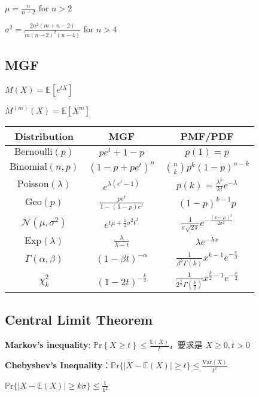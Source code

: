 \documentclass[9pt,landscape]{article}
\begin{document}
\begin{multicols}{3}
$\mu=\frac{n}{n-2}$ for $n>2$

$\sigma^2=\frac{2n^2(m+n-2)}{m(n-2)^2(n-4)}$ for $n>4$

\subsection{MGF}

$M(X)=\mathbb{E}\left[e^{tX}\right]$

$M^{(m)}(X)=\mathbb{E}\left[X^m\right]$

\begin{tabular}{|c|c|c|}
\hline
\textbf{Distribution} & \textbf{MGF} & \textbf{PMF/PDF}\\ \hline
$\mathrm{Bernoulli}(p)$ & $pe^t + 1-p$ & $p(1)=p$ \\ \hline
$\mathrm{Binomial}(n, p)$ & $(1-p + pe^t)^n$&$\binom{n}{k}p^k(1-p)^{n-k}$\\ \hline
$\mathrm{Poisson}(\lambda)$ & $e^{\lambda(e^t - 1)}$ &$p(k)=\frac{\lambda^k}{k!}e^{-\lambda}$\\ \hline
$\mathrm{Geo}(p)$ & $\frac{pe^t}{1-(1-p)e^t}$ & $(1-p)^{k-1}p$ \\ \hline
$\mathcal{N}(\mu, \sigma^2)$ & $e^{t\mu + \frac{1}{2}\sigma^2 t^2}$ &$\frac{1}{\sigma\sqrt{2\pi}}e^{-\frac{(x-\mu)^2}{2\sigma^2}}$  \\ \hline
$\mathrm{Exp}(\lambda)$ & $\frac{\lambda}{\lambda - t}$ & $\lambda e^{-\lambda x}$ \\ \hline
$\Gamma(\alpha, \beta)$ & $(1 - \beta t)^{-\alpha}$ & $\frac{1}{\beta^k\Gamma(k)}x^{k-1}e^{-\frac{x}{\beta}}$ \\ \hline
$\chi^2_k$ & $(1 - 2t)^{-\frac{k}{2}}$ &$\frac{1}{2^{\frac{k}{2}}\Gamma\left(\frac{k}{2}\right)}x^{\frac{k}{2}-1}e^{-\frac{x}{2}}$\\ \hline
\end{tabular}

\subsection{Central Limit Theorem}

\textbf{Markov's inequality}: $\mathbb{P}\mathrm{r}\left\{X\ge t\right\}\le\frac{\mathbb{E}(X)}{t}$，要求是 $X\ge 0, t>0$

\textbf{Chebyshev's Inequality}：$\mathbb{P}\mathrm{r}\{|X-\mathbb{E}(X)|\ge t\}\le\frac{\mathrm{Var}(X)}{t^2}$

$\mathbb{P}\mathrm{r}\{|X-\mathbb{E}(X)|\ge k\sigma\}\le\frac{1}{k^2}$


\end{multicols}
\end{document}
